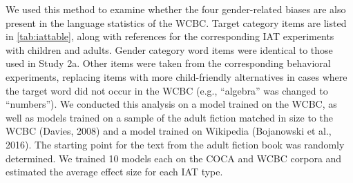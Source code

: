 \documentclass[
  english,
  ,man,floatsintext]{apa6}
\begin{document}
We used this method to examine whether the four gender-related biases are also present in the language statistics of the WCBC. Target category items are listed in \autoref{tab:iattable}, along with references for the corresponding IAT experiments with children and adults. Gender category word items were identical to those used in Study 2a. Other items were taken from the corresponding behavioral experiments, replacing items with more child-friendly alternatives in cases where the target word did not occur in the WCBC (e.g., \enquote{algebra} was changed to \enquote{numbers}). We conducted this analysis on a model trained on the WCBC, as well as models trained on a sample of the adult fiction matched in size to the WCBC (Davies, 2008) and a model trained on Wikipedia (Bojanowski et al., 2016). The starting point for the text from the adult fiction book was randomly determined. We trained 10 models each on the COCA and WCBC corpora and estimated the average effect size for each IAT type.

\begingroup\fontsize{9}{11}\selectfont
\end{document}
